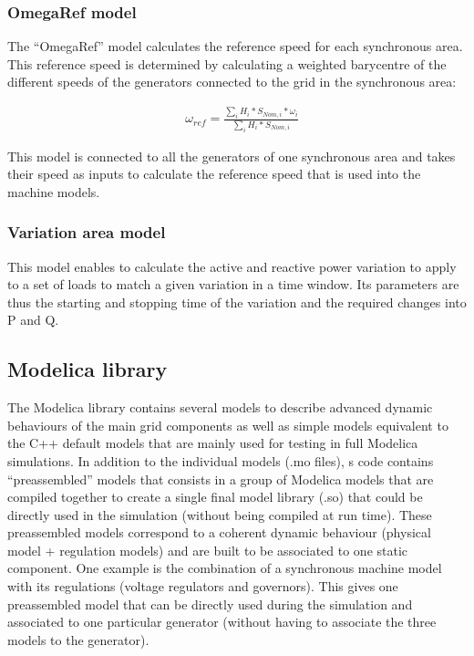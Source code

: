 \documentclass[a4paper, 12pt]{report}
\begin{document}
\subsubsection{OmegaRef model}

The ``OmegaRef'' model calculates the reference speed for each synchronous area. This reference speed is determined by calculating a weighted barycentre of the different speeds of the generators connected to the grid in the synchronous area:

\begin{equation}
\begin{aligned}
& \omega_{ref} = \frac{\sum\limits_{i} H_i * S_{Nom, i} * \omega_{i}}{\sum\limits_{i} H_i * S_{Nom, i}}
\end{aligned}
\label{Speed reference calculation}
\end{equation}

This model is connected to all the generators of one synchronous area and takes their speed as inputs to calculate the reference speed that is used into the machine models.

\subsubsection{Variation area model}

This model enables to calculate the active and reactive power variation to apply to a set of loads to match a given variation in a time window. Its parameters are thus the starting and stopping time of the variation and the required changes into P and Q.

\subsection{Modelica library}

The \Dynawo Modelica library contains several models to describe advanced dynamic behaviours of the main grid components as well as simple models equivalent to the C++ default models that are mainly used for testing in full Modelica simulations. In addition to the individual models (.mo files), \Dynawo\textquotesingle s code contains ``preassembled'' models that consists in a group of Modelica models that are compiled together to create a single final model library (.so) that could be directly used in the simulation (without being compiled at run time). These preassembled models correspond to a coherent dynamic behaviour (physical model + regulation models) and are built to be associated to one static component. One example is the combination of a synchronous machine model with its regulations (voltage regulators and governors). This gives one preassembled model that can be directly used during the simulation and associated to one particular generator (without having to associate the three models to the generator).
\end{document}

